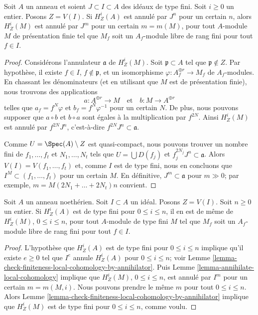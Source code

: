 \begin{lemma}
\label{lemma-annihilate-local-cohomology}
Soit $A$ un anneau et soient $J \subset I \subset A$ des idéaux de type fini.
Soit $i \geq 0$ un entier. Posons $Z = V(I)$. Si
$H^i_Z(A)$ est annulé par $J^n$ pour un certain $n$, alors
$H^i_Z(M)$ est annulé par $J^m$ pour un certain $m = m(M)$,
pour tout $A$-module $M$ de présentation finie tel que
$M_f$ soit un $A_f$-module libre de rang fini pour tout $f \in I$.
\end{lemma}

\begin{proof}
Considérons l'annulateur $\mathfrak a$ de $H^i_Z(M)$.
Soit $\mathfrak p \subset A$ tel que $\mathfrak p \not \in Z$.
Par hypothèse, il existe $f \in I$, $f \not \in \mathfrak p$,
et un isomorphisme $\varphi : A_f^{\oplus r} \to M_f$
de $A_f$-modules. En chassant les dénominateurs (et en utilisant que
$M$ est de présentation finie), nous trouvons des applications
$$
a : A^{\oplus r} \longrightarrow M
\quad\text{et}\quad
b : M \longrightarrow A^{\oplus r}
$$
telles que $a_f = f^N \varphi$ et $b_f = f^N \varphi^{-1}$ pour un certain $N$.
De plus, nous pouvons supposer que $a \circ b$ et $b \circ a$ sont égales à
la multiplication par $f^{2N}$. Ainsi $H^i_Z(M)$ est annulé par
$f^{2N}J^n$, c'est-à-dire $f^{2N}J^n \subset \mathfrak a$.

\medskip\noindent
Comme $U = \Spec(A) \setminus Z$ est quasi-compact, nous pouvons trouver un nombre fini de
$f_1, \ldots, f_t$ et $N_1, \ldots, N_t$ tels que $U = \bigcup D(f_j)$ et
$f_j^{2N_j}J^n \subset \mathfrak a$. Alors $V(I) = V(f_1, \ldots, f_t)$
et, comme $I$ est de type fini, nous en concluons que
$I^M \subset (f_1, \ldots, f_t)$ pour un certain $M$.
En définitive, $J^m \subset \mathfrak a$ pour
$m \gg 0$; par exemple, $m = M (2N_1 + \ldots + 2N_t) n$ convient.
\end{proof}

\begin{lemma}
\label{lemma-local-finiteness-for-finite-locally-free}
Soit $A$ un anneau noethérien. Soit $I \subset A$ un idéal. Posons $Z = V(I)$.
Soit $n \geq 0$ un entier. Si $H^i_Z(A)$ est de type fini pour $0 \leq i \leq n$,
il en est de même de $H^i_Z(M)$, $0 \leq i \leq n$, pour
tout $A$-module de type fini $M$ tel que $M_f$ soit un
$A_f$-module libre de rang fini pour tout $f \in I$.
\end{lemma}

\begin{proof}
L'hypothèse que $H^i_Z(A)$ est de type fini pour $0 \leq i \leq n$
implique qu'il existe $e \geq 0$ tel que $I^e$ annule
$H^i_Z(A)$ pour $0 \leq i \leq n$; voir
Lemme \ref{lemma-check-finiteness-local-cohomology-by-annihilator}.
Puis Lemme \ref{lemma-annihilate-local-cohomology}
implique que $H^i_Z(M)$, $0 \leq i \leq n$, est annulé
par $I^m$ pour un certain $m = m(M, i)$. Nous pouvons prendre le même $m$
pour tout $0 \leq i \leq n$. Alors
Lemme \ref{lemma-check-finiteness-local-cohomology-by-annihilator}
implique que $H^i_Z(M)$ est de type fini pour $0 \leq i \leq n$,
comme voulu.
\end{proof}





